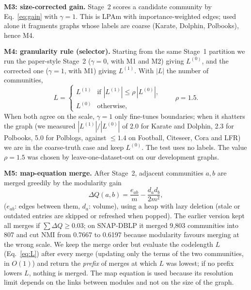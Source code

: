 \documentclass[conference]{IEEEtran}
\begin{document}
\textbf{M3: size-corrected gain.} Stage~2 scores a candidate community by Eq.~\eqref{eq:gain} with $\gamma=1$. This is LPAm with importance-weighted edges; used alone it fragments graphs whose labels are coarse (Karate, Dolphin, Polbooks), hence M4.

\textbf{M4: granularity rule (selector).} Starting from the same Stage~1 partition we run the paper-style Stage~2 ($\gamma=0$, with M1 and M2) giving $L^{(0)}$, and the corrected one ($\gamma=1$, with M1) giving $L^{(1)}$. With $|L|$ the number of communities,
\begin{equation}
L=\begin{cases}L^{(1)}&\text{if }|L^{(1)}|\le\rho\,|L^{(0)}|,\\ L^{(0)}&\text{otherwise,}\end{cases}\qquad\rho=1.5.\label{eq:gran}
\end{equation}
When both agree on the scale, $\gamma=1$ only fine-tunes boundaries; when it shatters the graph (we measured $|L^{(1)}|/|L^{(0)}|$ of 2.0 for Karate and Dolphin, 2.3 for Polbooks, 5.0 for Polblogs, against $\le1.4$ on Football, Citeseer, Cora and LFR) we are in the coarse-truth case and keep $L^{(0)}$. The test uses no labels. The value $\rho=1.5$ was chosen by leave-one-dataset-out on our development graphs.

\textbf{M5: map-equation merge.} After Stage~2, adjacent communities $a,b$ are merged greedily by the modularity gain
\begin{equation}
\Delta Q(a,b)=\frac{e_{ab}}{m}-\frac{d_ad_b}{2m^2},\label{eq:dq}
\end{equation}
($e_{ab}$: edges between them, $d_a$: volume), using a heap with lazy deletion (stale or outdated entries are skipped or refreshed when popped). The earlier version kept all merges if $\sum\Delta Q\ge0.03$; on SNAP-DBLP it merged 9{,}803 communities into 807 and cut NMI from 0.7667 to 0.6197 because modularity favours merging at the wrong scale. We keep the merge order but evaluate the codelength $L$ (Eq.~\eqref{eq:L}) after every merge (updating only the terms of the two communities, in $O(1)$) and return the \emph{prefix} of merges at which $L$ was lowest; if no prefix lowers $L$, nothing is merged. The map equation is used because its resolution limit depends on the links between modules and not on the size of the graph.
\end{document}
